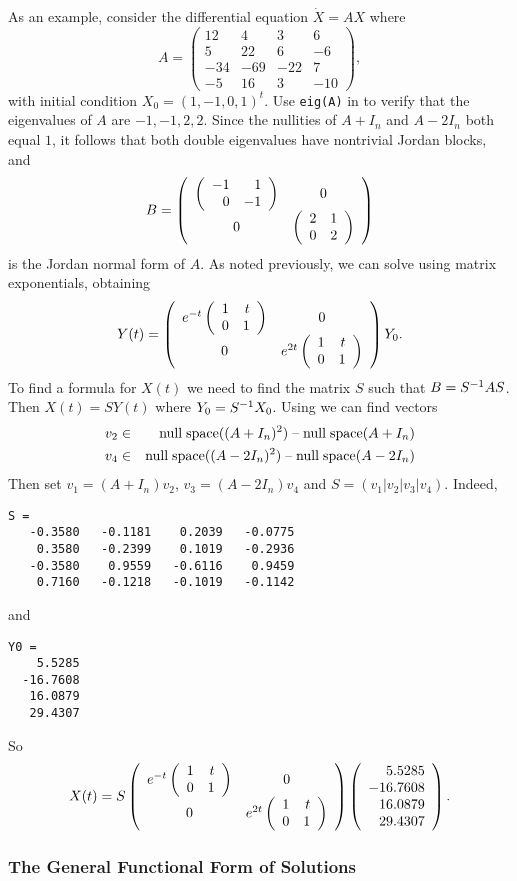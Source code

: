 \documentclass{ximera}
\begin{document}
As an example, consider the differential equation $\dot{X}=AX$ where
\begin{equation*}
A = \left(\begin{array}{rrrr} 12 & 4 & 3 & 6 \\ 5 & 22 & 6 & -6\\
-34 & -69 & -22 & 7\\ -5 & 16 & 3 & -10 \end{array}\right),
\end{equation*}
with initial condition $X_0=(1,-1,0,1)^t$.  Use {\tt eig(A)} in \Matlab to 
verify that the eigenvalues of $A$ are $-1,-1,2,2$.  Since the nullities of 
$A+I_n$ and $A-2I_n$ both equal $1$, it follows that both double eigenvalues
have nontrivial Jordan blocks, and
\[
B = \left(\begin{array}{cc} \left(\begin{array}{rr} -1 & 1\\ 0 &-1\end{array}\right) & 0\\ 0 &\left(\begin{array}{rr} 2 & 1\\ 0 &2\end{array}\right)\end{array}\right)
\]
is the Jordan normal form of $A$.  As noted previously, we can solve 
 using matrix exponentials, obtaining
\[
Y(t) =
\left(\begin{array}{cc} e^{-t}\left(\begin{array}{rr} 1 & t\\ 0 &1\end{array}\right) & 0\\ 0 &e^{2t}\left(\begin{array}{rr} 1 & t\\ 0 &1\end{array}\right)\end{array}\right)Y_0.
\]
To find a formula for $X(t)$ we need to find the matrix $S$ such that 
$B=S^{-1} AS$.  Then $X(t)=SY(t)$ where $Y_0=S^{-1} X_0$.  Using \Matlab we
can find vectors 
\begin{eqnarray*}
v_2 & \in & {\rm null\;space}((A+I_n)^2)\;\mbox{--}\;{\rm null\;space}(A+I_n) \\
v_4 & \in & {\rm null\;space}((A-2I_n)^2)\;\mbox{--}\;{\rm null\;space}(A-2I_n)
\end{eqnarray*}
Then set $v_1=(A+I_n)v_2$, $v_3=(A-2I_n)v_4$ and $S=(v_1|v_2|v_3|v_4)$. 
Indeed, 
\begin{verbatim}
S =
   -0.3580   -0.1181    0.2039   -0.0775
    0.3580   -0.2399    0.1019   -0.2936
   -0.3580    0.9559   -0.6116    0.9459
    0.7160   -0.1218   -0.1019   -0.1142
\end{verbatim}
and 
\begin{verbatim}
Y0 =
    5.5285
  -16.7608
   16.0879
   29.4307
\end{verbatim}
So 
\begin{equation}  \label{E:solvedebf}
X(t) = S\left(\begin{array}{cc} e^{-t}\left(\begin{array}{rr} 1 & t\\ 0 &1\end{array}\right) & 0\\ 0 &e^{2t}\left(\begin{array}{rr} 1 & t\\ 0 &1\end{array}\right)\end{array}\right)
\left(\begin{array}{r} 5.5285 \\  -16.7608 \\ 16.0879 \\ 29.4307\end{array}
\right).
\end{equation}

\subsubsection*{The General Functional Form of Solutions}
\end{document}
